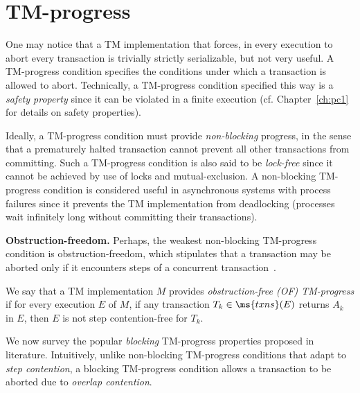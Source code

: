 \section{TM-progress}
\label{sec:tm-progress}
One may notice that a TM implementation that forces, in every execution to abort every transaction is trivially strictly
serializable, but not very useful.
A TM-progress condition specifies the conditions under which a transaction is allowed to abort.
Technically, a TM-progress condition specified this way is a \emph{safety property} since it can be violated
in a finite execution (cf. Chapter~\ref{ch:pc1} for details on safety properties).

Ideally, a TM-progress condition must provide \emph{non-blocking} progress, in the sense that a prematurely halted
transaction cannot prevent all other transactions from committing.
Such a TM-progress condition is also said to be \emph{lock-free}
since it cannot be achieved by use of locks and mutual-exclusion.
A non-blocking TM-progress condition is considered useful in asynchronous systems with process failures
since it prevents the TM implementation from deadlocking (processes wait infinitely long without
committing their transactions).

\vspace{1mm}\noindent\textbf{Obstruction-freedom.}
Perhaps, the weakest non-blocking TM-progress condition is obstruction-freedom, which stipulates
that a transaction may be aborted only if it encounters steps of a concurrent transaction~\cite{HS11-progress}.
\begin{definition}
We say that a TM implementation $M$ provides \emph{obstruction-free (OF) TM-progress} if for every execution $E$ of $M$, 
if any transaction $T_k \in \ms{txns}(E)$ returns $A_k$ in $E$, then $E$ is not step contention-free for $T_k$. 
\end{definition}
We now survey the popular \emph{blocking} TM-progress properties proposed in literature. Intuitively,
unlike non-blocking TM-progress conditions that adapt to \emph{step contention}, 
a blocking TM-progress condition allows a transaction to be aborted due to \emph{overlap contention}.

